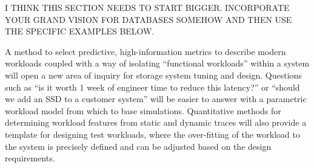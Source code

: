 
I THINK THIS SECTION NEEDS TO START BIGGER.  INCORPORATE YOUR GRAND VISION FOR DATABASES SOMEHOW AND THEN USE THE SPECIFIC EXAMPLES BELOW.  

A method to select
predictive, high-information metrics to describe modern workloads coupled with a way of isolating ``functional workloads'' within a system will open a new area of inquiry for storage system tuning and design.  Questions such as ``is it worth 1 week of engineer time to reduce this latency?'' or ``should we add an SSD to a customer system'' will be easier to answer with a parametric workload model from which to base simulations.%
%
Quantitative methods for determining workload features from static and dynamic
traces will also provide a template for designing test workloads, where the
over-fitting of the workload to the system is precisely defined and can be
adjusted based on the design requirements.



